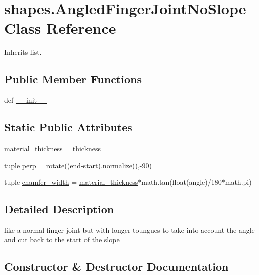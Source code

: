 \hypertarget{classshapes_1_1_angled_finger_joint_no_slope}{}\section{shapes.\+Angled\+Finger\+Joint\+No\+Slope Class Reference}
\label{classshapes_1_1_angled_finger_joint_no_slope}


Inherits list.

\subsection*{Public Member Functions}
\begin{DoxyCompactItemize}
\item 
def \hyperlink{classshapes_1_1_angled_finger_joint_no_slope_a2d2b4e6640f0738eba8998dc027995de}{\+\_\+\+\_\+init\+\_\+\+\_\+}
\end{DoxyCompactItemize}
\subsection*{Static Public Attributes}
\begin{DoxyCompactItemize}
\item 
\hyperlink{classshapes_1_1_angled_finger_joint_no_slope_a91b614d80a08eecf07213faeea10e29a}{material\+\_\+thickness} = thickness
\item 
tuple \hyperlink{classshapes_1_1_angled_finger_joint_no_slope_a6bfdc95eb46713361e3e22d07c3b3253}{perp} = rotate((end-\/start).normalize(),-\/90)
\item 
tuple \hyperlink{classshapes_1_1_angled_finger_joint_no_slope_a90d671bd76bee330bb7b57fc023d4d27}{chamfer\+\_\+width} = \hyperlink{classshapes_1_1_angled_finger_joint_no_slope_a91b614d80a08eecf07213faeea10e29a}{material\+\_\+thickness}$\ast$math.\+tan(float(angle)/180$\ast$math.\+pi)
\end{DoxyCompactItemize}


\subsection{Detailed Description}
\begin{DoxyVerb}like a normal finger joint but with longer toungues to take into account the angle and cut back to the start of the slope\end{DoxyVerb}
 

\subsection{Constructor \& Destructor Documentation}
\hypertarget{classshapes_1_1_angled_finger_joint_no_slope_a2d2b4e6640f0738eba8998dc027995de}{}
